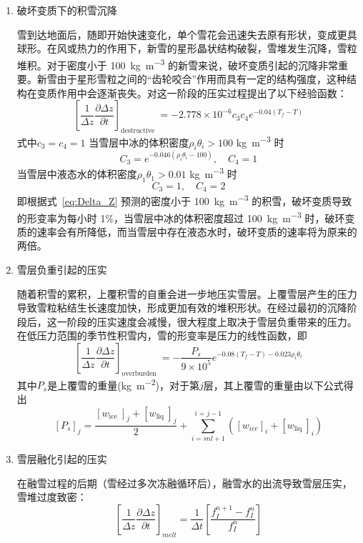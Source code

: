 \begin{enumerate}
\item 破坏变质下的积雪沉降

雪到达地面后，随即开始快速变化，单个雪花会迅速失去原有形状，变成更具球形。在风或热力的作用下，新雪的星形晶状结构破裂，雪堆发生沉降，雪粒堆积。对于密度小于 \qty{100}{kg.m^{-3}} 的新雪来说，破坏变质引起的沉降非常重要。新雪由于星形雪粒之间的“齿轮咬合”作用而具有一定的结构强度，这种结构在变质作用中会逐渐丧失。\citet{anderson1976point}对这一阶段的压实过程提出了以下经验函数：
\begin{equation}\label{eq:Delta_Z}
\left[\frac{1}{\Delta {z}} \frac{\partial \Delta {z}}{\partial {t}}\right]_{\text {destructive }}=-2.778 \times 10^{-6} {c}_{3} {c}_{4} {e}^{-0.04\left(T_f-T\right)}
\end{equation}
式中${c}_{3}={c}_{4}=1$
当雪层中冰的体积密度$\rho_{i} \theta_{i}>100$ \unit{kg.m^{-3}} 时
\begin{equation}
{C}_{3}={e}^{-0.046\left(\rho_{{i}} \theta_{{i}}-100\right)}, \quad {C}_{4}=1
\end{equation}
当雪层中液态水的体积密度$\rho_{1} \theta_{1}>0.01$ \unit{kg.m^{-3}} 时
\begin{equation}
{C}_{3}=1,\quad  {C}_{4}=2
\end{equation}
即根据式~\eqref{eq:Delta_Z} 预测的密度小于 \qty{100}{kg.m^{-3}} 的积雪，破坏变质导致的形变率为每小时 1\%，当雪层中冰的体积密度超过 \qty{100}{kg.m^{-3}} 时，破环变质的速率会有所降低，而当雪层中存在液态水时，破环变质的速率将为原来的两倍。

\item 雪层负重引起的压实

随着积雪的累积，上覆积雪的自重会进一步地压实雪层。上覆雪层产生的压力导致雪粒粘结生长速度加快，形成更加有效的堆积形状。在经过最初的沉降阶段后，这一阶段的压实速度会减慢，很大程度上取决于雪层负重带来的压力。在低压力范围的季节性积雪内，雪的形变率是压力的线性函数，即
\begin{equation}
\left[\frac{1}{\Delta {z}} \frac{\partial \Delta {z}}{\partial {t}}\right]_{\text {overburden }}=-\frac{{P}_{{s}}}{9 \times 10^{5}} {e}^{-0.08\left(T_f-{T}\right)-0.023 \rho_{{i}} \theta_{{i}}}
\end{equation}
其中$P_{s}$是上覆雪的重量(\unit{kg.m^{-2}})，对于第$j$层，其上覆雪的重量由以下公式得出
\begin{equation}
\left[P_{s}\right]_{j}=\frac{\left[w_{\text {ice }}\right]_{j}+\left[w_{\text {liq }}\right]_{j}}{2}+\sum_{{i}={snl}+1}^{{i}={j}-1}\left(\left[{w}_{{ice}}\right]_{{i}}+\left[{w}_{\text {liq }}\right]_{{i}}\right)
\end{equation}

\item 雪层融化引起的压实

在融雪过程的后期（雪经过多次冻融循环后），融雪水的出流导致雪层压实，雪堆过度致密：
\begin{equation}
\left[\frac{1}{\Delta {z}} \frac{\partial \Delta {z}}{\partial {t}}\right]_{{melt}}=\frac{1}{\Delta {t}}\left[\frac{{f}_{{I}}^{{n}+1}-{f}_{{I}}^{{n}}}{{f}_{{I}}^{{n}}}\right]
\end{equation}
\end{enumerate}


